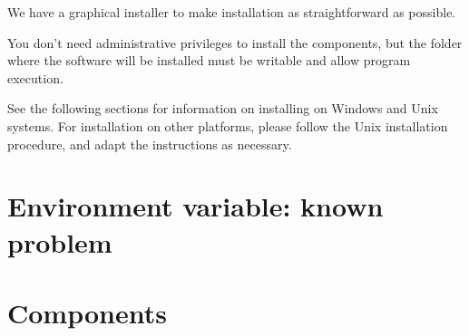 
We have a graphical installer to make installation as straightforward as possible. 

You don't need administrative privileges to install the components, but the folder where the software will be installed must be writable and allow program execution.

See the following sections for information on installing on Windows and Unix systems. For installation on  other platforms, please follow the Unix installation procedure, and adapt the instructions as necessary.

\section{Environment variable: known problem}



\section{Components}



